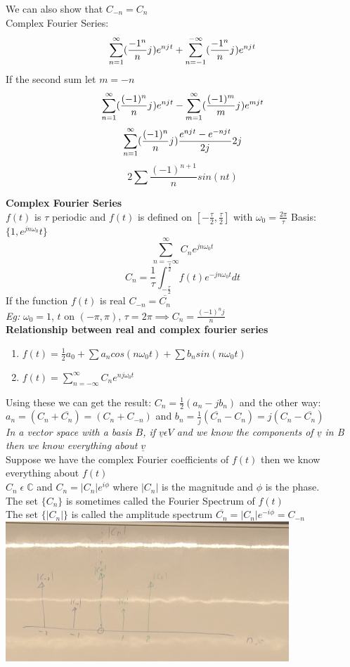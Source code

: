 \documentclass[11pt]{article}
\theoremstyle{definition}
\newcommand{\C}{\mathbb{C}}
\newcommand{\iu}{{j\mkern1mu}}
\begin{document}
We can also show that $C_{-n} = C_n$\\
Complex Fourier Series: $$\sum_{n = 1}^\infty (\frac{-1^n}{n}\iu)e^{n\iu t} + \sum_{n = -1}^{-\infty} (\frac{-1^n}{n}\iu)e^{n\iu t}$$
If the second sum let $m = -n$
$$\sum_{n = 1}^\infty (\frac{(-1)^n}{n}\iu)e^{n\iu t} - \sum_{m = 1}^{\infty} (\frac{(-1)^m}{m}\iu)e^{m\iu t}$$
$$\sum_{n = 1}^\infty (\frac{(-1)^n}{n}\iu)\frac{e^{n\iu t} - e^{-n \iu t}}{2\iu}2\iu$$
$$2\sum\frac{(-1)^{n+1}}{n}sin(nt)$$

\newpage
\textbf{Complex Fourier Series}\\
$f(t)$ is $\tau$ periodic and $f(t)$ is defined on $[-\frac{\tau}{2}, \frac{\tau}{2}]$ with $\omega_0 = \frac{2\pi}{\tau}$
Basis: $\{1, e^{jn\omega_0}t\}$
$$\sum_{n=-\infty}^\infty C_n e^{jn\omega_0 t}$$
$$C_n = \frac{1}{\tau}\int^\frac{\tau}{2}_{-\frac{\tau}{2}}f(t)e^{-jn\omega_0 t}dt$$
If the function $f(t)$ is real $C_{-n} = \overline{C_n}$\\
\textit{Eg:} $\omega_0 = 1$, $t \text{ on } (-\pi, \pi)$, $\tau = 2\pi \implies C_n = \frac{(-1)^nj}{n}$\\
\textbf{Relationship between real and complex fourier series}
\begin{enumerate}[topsep=-10pt]
    \item $f(t) = \frac{1}{2}a_0 + \sum a_n cos(n\omega_0 t) + \sum b_n sin(n\omega_0 t)$
    \item $f(t) = \sum_{n=-\infty}^\infty C_n e^{nj\omega_0 t}$
\end{enumerate}
Using these we can get the result: $C_n = \frac{1}{2}(a_n - jb_n)$ and the other way: $a_n = (C_n + \overline{C_n}) = (C_n + {C_{-n}})$ and $b_n = \frac{1}{j}(\overline{C_n} - C_n) = j(C_n - \overline{C_n})$\\
\hfill\break
\textit{In a vector space with a basis $B$, if $\underline{v} \epsilon V$ and we know the components of $\underline{v}$ in B then we know everything about $\underline{v}$}\\
Suppose we have the complex Fourier coefficients of $f(t)$ then we know everything about $f(t)$\\
$C_n\; \epsilon\; \C$ and $C_n = |C_n|e^{i\phi}$ where $|C_n|$ is the magnitude and $\phi$ is the phase.\\
The set $\{C_n\}$ is sometimes called the Fourier Spectrum of  $f(t)$\\
The set $\{|C_n|\}$ is called the amplitude spectrum
$\overline{C_n} = |C_n|e^{-i\phi} = C_{-n}$\\
\includegraphics[width=0.8\textwidth]{MVIMG_20181113_085445.jpg}\\
\end{document}
